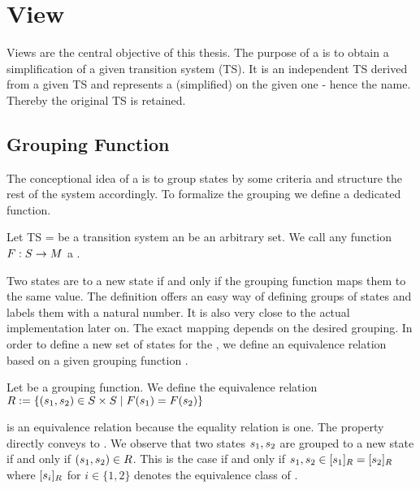 \documentclass[preview]{standalone}
\begin{document}
\section{View}
Views are the central objective of this thesis. The purpose of a \viewN is to obtain a simplification of a given transition system (TS).  It is an independent TS derived from a given TS and represents a (simplified) \viewN on the given one - hence the name. Thereby the original TS is retained. 

\subsection{Grouping Function}



The conceptional idea of a \viewN is to group states by some criteria and structure the rest of the system accordingly. To formalize the grouping we define a dedicated function.

\begin{definition}
	Let TS = \transitionsystem be a transition system an \arbset be an arbitrary set. We call any function $F : {S} \to {\ensuremath{{M}}}$ a \emph{\grpfctN}. 
	
	\label{def:grpfct}
\end{definition}


Two states are  to a new state if and only if the grouping function maps them to the same value. The definition offers an easy way of defining groups of states and labels them with a natural number. It is also very close to the actual implementation later on. The exact mapping depends on the desired grouping. In order to define a new set of states for the \viewN, we define an equivalence relation \eqrelview based on a given grouping function \grpfct.

\begin{definition}
	Let \grpfct be a grouping function. We define the equivalence relation ${R} :=\{ ({s}_1, {s}_2) \in {S} \times {S} \mid {F}({s}_1) = {F}({s}_2)\}$
	
	\label{def:eqrelview}
\end{definition}

\eqrelview is an equivalence relation because the equality relation is one. The property directly conveys to \eqrelview. We observe that two states ${s}_1, {s}_2$ are grouped to a new state if and only if $({s}_1, {s}_2) \in {R}$. This is the case if and only if ${s}_1, {s}_2 \in {\ensuremath{{[{s}_1]_{{R}}}}} = {{[{s}_2]_{{R}}}}$ where ${{[{s}_i]_{{R}}}}$ for $i \in \{1,2\}$ denotes the equivalence class of \eqrelview.
\end{document}
